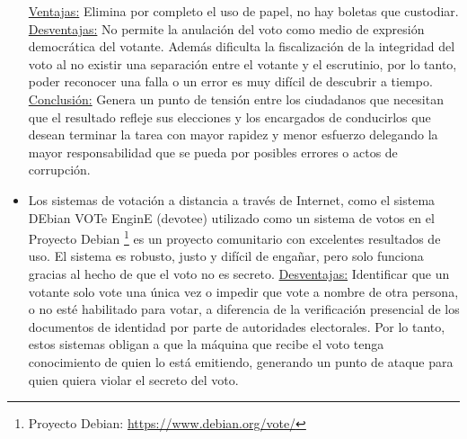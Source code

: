 \begin{itemize}
    \underline{Ventajas:} Elimina por completo el uso de papel, no hay boletas que custodiar.\newline
    \underline{Desventajas:} No permite la anulación del voto como medio de expresión democrática del votante. Además dificulta la fiscalización de la integridad del voto al no existir una separación entre el votante y el escrutinio, por lo tanto, poder reconocer una falla o un error es muy difícil de descubrir a tiempo. \newline
    \underline{Conclusión:} Genera un punto de tensión entre los ciudadanos que necesitan que el resultado refleje sus elecciones y los encargados de conducirlos que desean terminar la tarea con mayor rapidez y menor esfuerzo delegando la mayor responsabilidad que se pueda por posibles errores o actos de corrupción.
    \item Los sistemas de votación a distancia a través de Internet, como el sistema DEbian VOTe EnginE (devotee) utilizado como un sistema de votos en el Proyecto Debian \footnote{Proyecto Debian: \url{https://www.debian.org/vote/}} es un proyecto comunitario con excelentes resultados de uso. El sistema es robusto, justo y difícil de engañar, pero solo funciona gracias al hecho de que el voto no es secreto.\newline
    \underline{Desventajas:} Identificar que un votante solo vote una única vez o impedir que vote a nombre de otra persona, o no esté habilitado para votar, a diferencia de la verificación presencial de los documentos de identidad por parte de autoridades electorales. Por lo tanto, estos sistemas obligan a que la máquina que recibe el voto tenga conocimiento de quien lo está emitiendo, generando un punto de ataque para quien quiera violar el secreto del voto.
\end{itemize}


